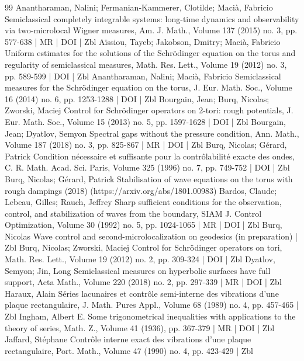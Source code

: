 \begin{thebibliography}{99}
Anantharaman, Nalini; Fermanian-Kammerer, Clotilde; Macià, Fabricio Semiclassical completely integrable systems: long-time dynamics and observability via two-microlocal Wigner measures, Am. J. Math., Volume 137 (2015) no. 3, pp. 577-638 | MR | DOI | Zbl
Aïssiou, Tayeb; Jakobson, Dmitry; Macià, Fabricio Uniform estimates for the solutions of the Schrödinger equation on the torus and regularity of semiclassical measures, Math. Res. Lett., Volume 19 (2012) no. 3, pp. 589-599 | DOI | Zbl
Anantharaman, Nalini; Macià, Fabricio Semiclassical measures for the Schrödinger equation on the torus, J. Eur. Math. Soc., Volume 16 (2014) no. 6, pp. 1253-1288 | DOI | Zbl
Bourgain, Jean; Burq, Nicolas; Zworski, Maciej Control for Schrödinger operators on 2-tori: rough potentials, J. Eur. Math. Soc., Volume 15 (2013) no. 5, pp. 1597-1628 | DOI | Zbl
Bourgain, Jean; Dyatlov, Semyon Spectral gaps without the pressure condition, Ann. Math., Volume 187 (2018) no. 3, pp. 825-867 | MR | DOI | Zbl
Burq, Nicolas; Gérard, Patrick Condition nécessaire et suffisante pour la contrôlabilité exacte des ondes, C. R. Math. Acad. Sci. Paris, Volume 325 (1996) no. 7, pp. 749-752 | DOI | Zbl
Burq, Nicolas; Gérard, Patrick Stabilisation of wave equations on the torus with rough dampings (2018) (https://arxiv.org/abs/1801.00983)
Bardos, Claude; Lebeau, Gilles; Rauch, Jeffrey Sharp sufficient conditions for the observation, control, and stabilization of waves from the boundary, SIAM J. Control Optimization, Volume 30 (1992) no. 5, pp. 1024-1065 | MR | DOI | Zbl
Burq, Nicolas Wave control and second-microlocalization on geodesics (in preparation) | Zbl
Burq, Nicolas; Zworski, Maciej Control for Schrödinger operators on tori, Math. Res. Lett., Volume 19 (2012) no. 2, pp. 309-324 | DOI | Zbl
Dyatlov, Semyon; Jin, Long Semiclassical measures on hyperbolic surfaces have full support, Acta Math., Volume 220 (2018) no. 2, pp. 297-339 | MR | DOI | Zbl
Haraux, Alain Séries lacunaires et contrôle semi-interne des vibrations d’une plaque rectangulaire, J. Math. Pures Appl., Volume 68 (1989) no. 4, pp. 457-465 | Zbl
Ingham, Albert E. Some trigonometrical inequalities with applications to the theory of series, Math. Z., Volume 41 (1936), pp. 367-379 | MR | DOI | Zbl
Jaffard, Stéphane Contrôle interne exact des vibrations d’une plaque rectangulaire, Port. Math., Volume 47 (1990) no. 4, pp. 423-429 | Zbl

\end{thebibliography}
